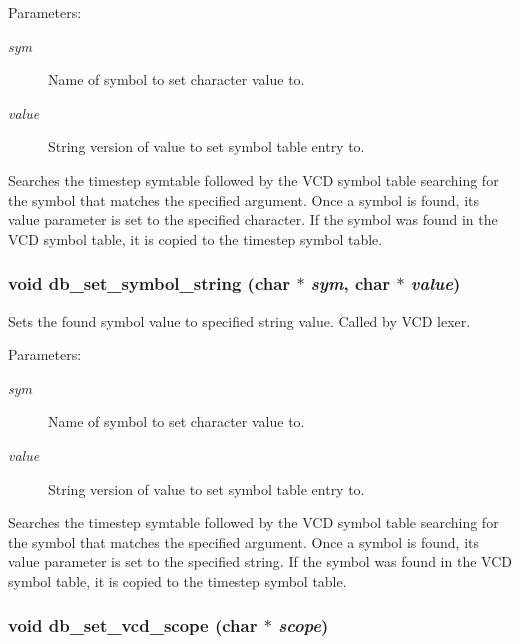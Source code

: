 \begin{Desc}
\item[Parameters: ]\par
\begin{description}
\item[{\em 
sym}]Name of symbol to set character value to. \item[{\em 
value}]String version of value to set symbol table entry to.\end{description}
\end{Desc}
Searches the timestep symtable followed by the VCD symbol table searching for the symbol that matches the specified argument. Once a symbol is found, its value parameter is set to the specified character. If the symbol was found in the VCD symbol table, it is copied to the timestep symbol table. 
\subsubsection{\setlength{\rightskip}{0pt plus 5cm}void db\_\-set\_\-symbol\_\-string (char $\ast$ {\em sym}, char $\ast$ {\em value})}\label{db_8h_a17}


Sets the found symbol value to specified string value. Called by VCD lexer.

\begin{Desc}
\item[Parameters: ]\par
\begin{description}
\item[{\em 
sym}]Name of symbol to set character value to. \item[{\em 
value}]String version of value to set symbol table entry to.\end{description}
\end{Desc}
Searches the timestep symtable followed by the VCD symbol table searching for the symbol that matches the specified argument. Once a symbol is found, its value parameter is set to the specified string. If the symbol was found in the VCD symbol table, it is copied to the timestep symbol table. 
\subsubsection{\setlength{\rightskip}{0pt plus 5cm}void db\_\-set\_\-vcd\_\-scope (char $\ast$ {\em scope})}\label{db_8h_a14}


